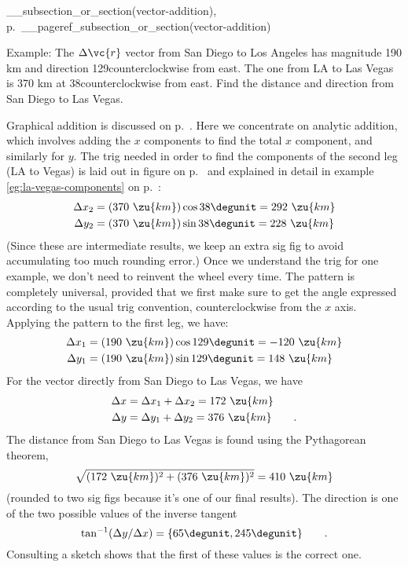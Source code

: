 __subsection_or_section(vector-addition), p.~__pageref_subsection_or_section(vector-addition)

Example:
The $\Delta\vc{r}$ vector from San Diego to Los Angeles has magnitude 190 km and direction 129\degunit counterclockwise from east.
The one from LA to Las Vegas is 370 km at 38\degunit counterclockwise from east. Find the distance and direction from
San Diego to Las Vegas.

\eganswer
Graphical addition is discussed on p.~\pageref{subsec:vector-addition-graphical}. Here we concentrate on analytic addition,
which involves adding the $x$ components to find the total $x$ component, and similarly for $y$. The trig needed in order
to find the components of the second leg (LA to Vegas) is laid out in figure  on p.~\pageref{fig:eg-la-vegas} and explained in detail
in example \ref{eg:la-vegas-components} on p.~\pageref{eg:la-vegas-components}:
\begin{align*}
  \Delta x_2 &= (370\ \zu{km})\cos 38\degunit = 292\ \zu{km} \\
  \Delta y_2 &= (370\ \zu{km})\sin 38\degunit = 228\ \zu{km} 
\end{align*}
(Since these are intermediate results, we keep an extra sig fig to avoid accumulating too much rounding error.)
Once we understand the trig for one example, we don't need to reinvent the wheel every time. The pattern is completely universal,
provided that we first make sure to get the angle expressed according to the usual trig convention, counterclockwise from the $x$ axis.
Applying the pattern to the first leg, we have:
\begin{align*}
  \Delta x_1 &= (190\ \zu{km})\cos 129\degunit = -120\ \zu{km} \\
  \Delta y_1 &= (190\ \zu{km})\sin 129\degunit = 148\ \zu{km} 
\end{align*}
For the vector directly from San Diego to Las Vegas, we have
\begin{align*}
  \Delta x &= \Delta x_1 +  \Delta x_2 = 172\ \zu{km}\\
  \Delta y &= \Delta y_1 +  \Delta y_2 = 376\ \zu{km} \qquad .
\end{align*}
The distance from San Diego to Las Vegas is found using the Pythagorean theorem,
\begin{equation*}
  \sqrt{(172\ \zu{km})^2+(376\ \zu{km})^2} = 410\ \zu{km}
\end{equation*}
(rounded to two sig figs because it's one of our final results). The direction
is one of the two possible values of the inverse tangent
\begin{equation*}
  \tan^{-1} (\Delta y/\Delta x) = \{65\degunit,245\degunit\} \qquad .
\end{equation*}
Consulting a sketch shows that the first of these values is the correct one.\label{end-skills}
